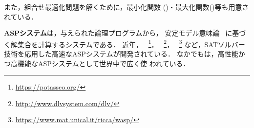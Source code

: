 また，組合せ最適化問題を解くために，最小化関数
()・最大化関数()等も用意されている．

\textbf{ASPシステム}は，与えられた論理プログラムから，
安定モデル意味論~\cite{Gelfond88:iclp}
に基づく解集合を計算するシステムである．
近年，
{\clingo}~\footnote{\url{https://potassco.org/}}，
{\dlv}~\footnote{\url{http://www.dlvsystem.com/dlv/}}，
{\wasp}~\footnote{\url{https://www.mat.unical.it/ricca/wasp/}}
など，SATソルバー技術を応用した高速なASPシステムが開発されている．
なかでも{\clingo}は，高性能かつ高機能なASPシステムとして世界中で広く使
われている．










